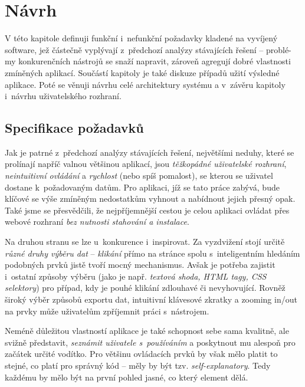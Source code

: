 \documentclass[thesis=B,czech]{FITthesis}[2012/06/26]
\begin{document}

\chapter{Návrh}
V této kapitole definuji funkční i~nefunkční požadavky kladené na vyvíjený software, jež částečně vyplývají z~předchozí analýzy stávajících řešení -- problé-my konkurenčních nástrojů se snaží napravit, zároveň agregují dobré vlastnosti zmíněných aplikací. Součástí kapitoly je také diskuze případů užití výsledné aplikace. Poté se věnuji návrhu celé architektury systému a v~závěru kapitoly i~návrhu uživatelského rozhraní.


\label{sec:requirements_specification}
\section{Specifikace požadavků}
Jak je patrné z~předchozí analýzy stávajících řešení, největšími neduhy, které se prolínají napříč valnou většinou aplikací, jsou \emph{těžkopádné uživatelské rozhraní}, \emph{neintuitivní ovládání} a \emph{rychlost} (nebo spíš pomalost), se kterou se uživatel dostane k~požadovaným datům. Pro aplikaci, jíž se tato práce zabývá, bude klíčové se výše zmíněným nedostatkům vyhnout a nabídnout jejich přesný opak. Také jsme se přesvědčili, že nejpříjemnější cestou je celou aplikaci ovládat přes webové rozhraní  \emph{bez nutnosti stahování a instalace}.

Na druhou stranu se lze u~konkurence i~inspirovat. Za vyzdvižení stojí určitě \emph{různé druhy výběru dat} -- \emph{klikání} přímo na stránce spolu s~inteligentním hledáním podobných prvků jistě tvoří mocný mechanismus. Avšak je potřeba zajistit i~ostatní způsoby výběru (jako je např. \emph{textová shoda, HTML tagy, CSS selektory}) pro případ, kdy je pouhé klikání zdlouhavé či nevyhovující. Rovněž široký výběr způsobů exportu dat, intuitivní klávesové zkratky a zooming in/out na prvky může uživatelům zpříjemnit práci s~nástrojem.

Neméně důležitou vlastností aplikace je také schopnost sebe sama kvalitně, ale svižně představit, \emph{seznámit uživatele s~používáním} a poskytnout mu alespoň pro začátek určité vodítko. Pro většinu ovládacích prvků by však mělo platit to stejné, co platí pro správný kód -- měly by být tzv. \emph{self-explanatory}. Tedy každému by mělo být na první pohled jasné, co který element dělá.
\end{document}
